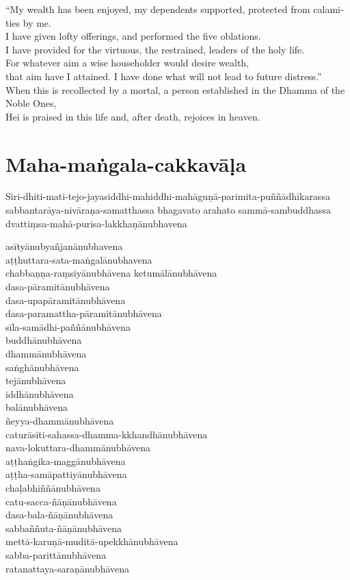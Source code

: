 \begin{english}
  ``My wealth has been enjoyed, my dependents supported, protected from calamities by me.\\
  I have given lofty offerings, and performed the five oblations.\\
  I have provided for the virtuous, the restrained, leaders of the holy life.\\
  For whatever aim a wise householder would desire wealth,\\
  that aim have I attained. I have done what will not lead to future distress.''\\
  When this is recollected by a mortal, a person established in the Dhamma of the Noble Ones,\\
  Hei is praised in this life and, after death, rejoices in heaven.
\end{english}



\section{Maha-maṅgala-cakkavāḷa}


Siri-dhiti-mati-tejo-jayasiddhi-mahiddhi-mahāguṇā-parimita-puññādhikarassa
sabbantarāya-nivāraṇa-samatthassa bhagavato arahato sammā-sambuddhassa
dvattiṃsa-mahā-purisa-lakkhaṇānubhavena

asītyānubyañjanānubhavena\\
aṭṭhuttara-sata-maṅgalānubhavena\\
chabbaṇṇa-raṃsiyānubhāvena ketumālānubhāvena\\
dasa-pāramitānubhāvena\\
dasa-upapāramitānubhāvena\\
dasa-paramattha-pāramitānubhāvena\\
sīla-samādhi-paññānubhāvena\\
buddhānubhāvena\\
dhammānubhāvena\\
saṅghānubhāvena\\
tejānubhāvena\\
iddhānubhāvena\\
balānubhāvena\\
ñeyya-dhammānubhāvena\\
caturāsīti-sahassa-dhamma-kkhandhānubhāvena\\
nava-lokuttara-dhammānubhāvena\\
aṭṭhaṅgika-maggānubhāvena\\
aṭṭha-samāpattiyānubhāvena\\
chaḷabhiññānubhāvena\\
catu-sacca-ñāṇānubhāvena\\
dasa-bala-ñāṇānubhāvena\\
sabbaññuta-ñāṇānubhāvena\\
mettā-karuṇā-muditā-upekkhānubhāvena\\
sabba-parittānubhāvena\\
ratanattaya-saraṇānubhāvena

